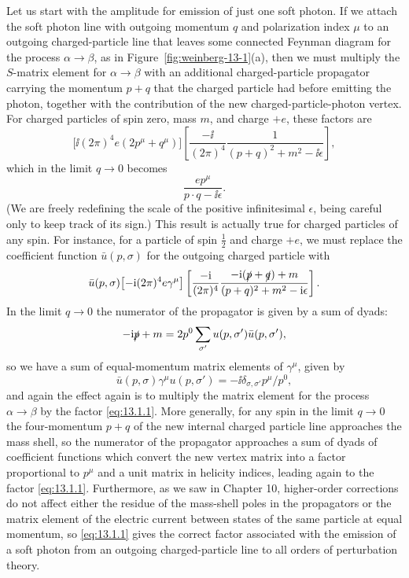 Let us start with the amplitude for emission of just one soft photon. If we
attach the soft photon line with outgoing momentum $q$ and polarization
index $\mu$ to an outgoing charged-particle line that leaves some connected
Feynman diagram for the process $\alpha\to\beta$, as in
Figure~\ref{fig:weinberg-13-1}(a), then we
must multiply the $S$-matrix element for $\alpha\to\beta$ with an additional
charged-particle propagator carrying the momentum $p+q$ that the charged particle
had before emitting the photon, together with the contribution of the new
charged-particle-photon vertex. For charged particles of spin zero, mass
$m$, and charge $+e$, these factors are
\[
  \bigl[\ii(2\pi)^4e(2p^\mu+q^\mu)\bigr]
  \left[\frac{-\ii}{(2\pi)^4}\frac{1}{(p+q)^2+m^2-\ii\epsilon}\right],
\]
which in the limit $q\to0$ becomes
\begin{equation}
  \frac{e p^\mu}{p\cdot q-\ii\epsilon}.
  \tag{13.1.1}\label{eq:13.1.1}
\end{equation}
(We are freely redefining the scale of the positive infinitesimal $\epsilon$, being
careful only to keep track of its sign.) This result is actually true for
charged particles of any spin. For instance, for a particle of spin $\tfrac12$ and
charge $+e$, we must replace the coefficient function $\bar u(p,\sigma)$ for the outgoing
charged particle with
\[
  \bar u(p,\sigma)\bigl[-\mathrm{i}(2\pi)^4e\gamma^\mu\bigr]
  \left[\frac{-\mathrm{i}}{(2\pi)^4}
  \frac{-\mathrm{i}(\slashed{p}+\slashed{q})+m}{(p+q)^2+m^2-\mathrm{i}\epsilon}\right].
\]
In the limit $q\to0$ the numerator of the propagator is given by a sum of
dyads:
\[
  -\mathrm{i}\slashed{p}+m=2p^0\sum_{\sigma'}u(p,\sigma')\bar u(p,\sigma'),
\]
so we have a sum of equal-momentum matrix elements of $\gamma^\mu$, given by
\[
  \bar u(p,\sigma)\gamma^\mu u(p,\sigma')
  =-\ii\delta_{\sigma,\sigma'}p^\mu/p^0,
\]
and again the effect again is to multiply the matrix element for the
process $\alpha\to\beta$ by the factor \eqref{eq:13.1.1}. More generally, for any spin in
the limit $q\to0$ the four-momentum $p+q$ of the new internal charged
particle line approaches the mass shell, so the numerator of the propagator
approaches a sum of dyads of coefficient functions which convert the new
vertex matrix into a factor proportional to $p^\mu$ and a unit matrix in helicity
indices, leading again to the factor \eqref{eq:13.1.1}. Furthermore, as we saw in
Chapter 10, higher-order corrections do not affect either the residue of the
mass-shell poles in the propagators or the matrix element of the electric
current between states of the same particle at equal momentum, so \eqref{eq:13.1.1}
gives the correct factor associated with the emission of a soft photon from
an outgoing charged-particle line to all orders of perturbation theory.

